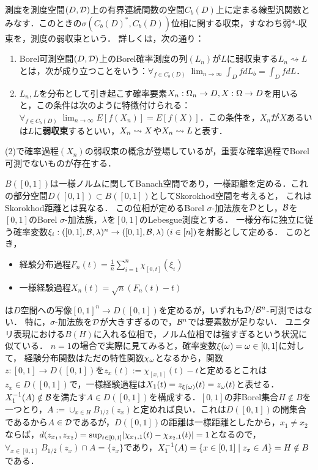 \documentclass[uplatex,dvipdfmx]{jsreport}
\begin{document}
\begin{definition}
    測度を測度空間$(D,\mathcal{D})$上の有界連続関数の空間$C_b(D)$上に定まる線型汎関数とみなす．このときの$\sigma(C_b(D)^*,C_b(D))$位相に関する収束，すなわち弱$*$-収束を，測度の弱収束という．
    詳しくは，次の通り：
    \begin{enumerate}
        \item Borel可測空間$(D,\mathcal{D})$上のBorel確率測度の列$(L_n)$が$L$に弱収束する$L_n\rightsquigarrow L$とは，次が成り立つことをいう：$\forall_{f\in C_b(D)}\;\lim_{n\to\infty}\int_DfdL_b=\int_DfdL$．
        \item $L_n,L$を分布として引き起こす確率要素$X_n:\Omega_n\to D,X:\Omega\to D$を用いると，この条件は次のように特徴付けられる：$\forall_{f\in C_b(D)}\;\lim_{n\to\infty}E[f(X_n)]=E[f(X)]$．この条件を，$X_n$が$X$あるいは$L$に\textbf{弱収束}するといい，$X_n\rightsquigarrow X$や$X_n\rightsquigarrow L$と表す．
    \end{enumerate}
\end{definition}
\begin{remark}
    (2)で確率過程$(X_n)$の弱収束の概念が登場しているが，重要な確率過程でBorel可測でないものが存在する．
\end{remark}

\begin{example}\label{exp-non-measurable-process}
    $B([0,1])$は一様ノルムに関してBanach空間であり，一様距離を定める．これの部分空間$D([0,1])\subset B([0,1])$としてSkorokhod空間を考えると，
    これはSkorokhod距離とは異なる．
    この位相が定めるBorel $\sigma$-加法族を$\mathcal{D}$とし，$\mathcal{B}$を$[0,1]$のBorel $\sigma$-加法族，$\lambda$を$[0,1]$のLebesgue測度とする．
    一様分布に独立に従う確率変数$\xi_i:([0,1],\mathcal{B},\lambda)^n\to([0,1],\mathcal{B},\lambda)\;(i\in[n])$を射影として定める．
    このとき，
    \begin{itemize}
        \item 経験分布過程$F_n(t)=\frac{1}{n}\sum_{i=1}^n\chi_{[0,t]}(\xi_i)$
        \item 一様経験過程$X_n(t)=\sqrt{n}(F_n(t)-t)$
    \end{itemize}
    は$D$空間への写像$[0,1]^n\to D([0,1])$を定めるが，いずれも$\mathcal{D}/\mathcal{B}^n$-可測ではない．
    特に，$\sigma$-加法族を$\mathcal{D}$が大きすぎるので，$\mathcal{B}^n$では要素数が足りない．
    ユニタリ表現における$B(H)$に入れる位相で，ノルム位相では強すぎるという状況に似ている．
    $n=1$の場合で実際に見てみると，確率変数$\xi(\omega)=\omega\in[0,1]$に対して，
    経験分布関数はただの特性関数$\chi_{\omega}$となるから，関数$z:[0,1]\to D([0,1])$を$z_x(t):=\chi_{[x,1]}(t)-t$と定めるとこれは$z_x\in D([0,1])$で，一様経験過程は$X_1(t)=z_{\xi(\omega)}(t)=z_\omega(t)$と表せる．
    $X_1^{-1}(A)\notin\mathcal{B}$を満たす$A\in D([0,1])$を構成する．$[0,1]$の非Borel集合$H\notin B$を一つとり，$A:=\cup_{x\in H}B_{1/2}(z_x)$と定めれば良い．これは$D([0,1])$の開集合であるから$A\in\mathcal{D}$であるが，$D([0,1])$の距離は一様距離としたから，$x_1\ne x_2$ならば，$d(z_{x_1},z_{x_2})=\sup_{t\in[0,1]}\lvert\chi_{x_1,1}(t)-\chi_{x_2,1}(t)\rvert=1$となるので，$\forall_{x\in[0,1]}\;B_{1/2}(z_x)\cap A=\{z_x\}$であり，$X_1^{-1}(A)=\left\{x\in[0,1]\mid z_x\in A\right\}=H\notin B$である．
\end{example}
\end{document}
